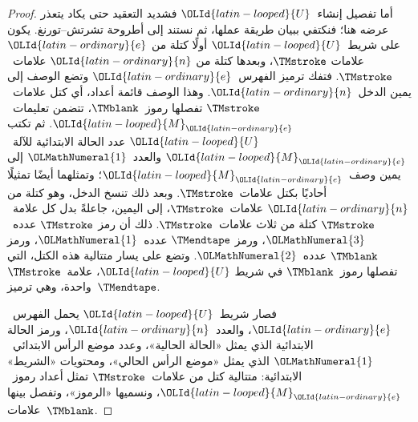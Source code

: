 \documentclass[../../../include/open-logic-section]{subfiles}
\begin{document}
\begin{proof}
  أما تفصيل إنشاء~${\OLId{latin-looped}{U}}$ فشديد التعقيد حتى يكاد يتعذر عرضه هنا؛
  فنكتفي ببيان طريقة عملها، ثم نستند إلى أطروحة تشرتش--تورنغ.
  يكون على شريط~${\OLId{latin-looped}{U}}$ أولًا كتلة من ${\OLId{latin-ordinary}{e}}$ علامات $\TMstroke$،
  وبعدها كتلة من ${\OLId{latin-ordinary}{n}}$ علامات~$\TMstroke$. فتفك ترميز الفهرس~${\OLId{latin-ordinary}{e}}$
  وتضع الوصف إلى يمين الدخل~${\OLId{latin-ordinary}{n}}$. وهذا الوصف قائمة أعداد، أي كتل
  علامات~$\TMstroke$ تفصلها رموز~$\TMblank$، تتضمن تعليمات~${\OLId{latin-looped}{M}}_{\OLId{latin-ordinary}{e}}$.
  ثم تكتب ${\OLId{latin-looped}{U}}$ عدد الحالة الابتدائية للآلة~${\OLId{latin-looped}{M}}_{\OLId{latin-ordinary}{e}}$ والعدد~${\OLMathNumeral{1}}$
  إلى يمين وصف~${\OLId{latin-looped}{M}}_{\OLId{latin-ordinary}{e}}$؛ وتمثلهما أيضًا تمثيلًا أحاديًا بكتل
  علامات~$\TMstroke$. وبعد ذلك تنسخ الدخل، وهو كتلة من ${\OLId{latin-ordinary}{n}}$
  علامات~$\TMstroke$، إلى اليمين، جاعلةً بدل كل علامة~$\TMstroke$
  كتلة من ثلاث علامات~$\TMstroke$. ذلك أن رمز $\TMstroke$
  عدده~${\OLMathNumeral{3}}$، ورمز $\TMendtape$ عدده~${\OLMathNumeral{1}}$، ورمز $\TMblank$
  عدده~${\OLMathNumeral{2}}$. وتضع على يسار متتالية هذه الكتل، التي تفصلها
  رموز~$\TMblank$ في شريط ${\OLId{latin-looped}{U}}$، علامة~$\TMstroke$ واحدة،
  وهي ترميز~$\TMendtape$.

  فصار شريط~${\OLId{latin-looped}{U}}$ يحمل الفهرس~${\OLId{latin-ordinary}{e}}$، والعدد~${\OLId{latin-ordinary}{n}}$، ورمز الحالة
  الابتدائية الذي يمثل «الحالة الحالية»، وعدد موضع الرأس الابتدائي~${\OLMathNumeral{1}}$
  الذي يمثل «موضع الرأس الحالي»، ومحتويات «الشريط» الابتدائية:
  متتالية كتل من علامات~$\TMstroke$ تمثل أعداد رموز~${\OLId{latin-looped}{M}}_{\OLId{latin-ordinary}{e}}$،
  ونسميها «الرموز»، وتفصل بينها علامات~$\TMblank$.


\end{proof}
\end{document}
